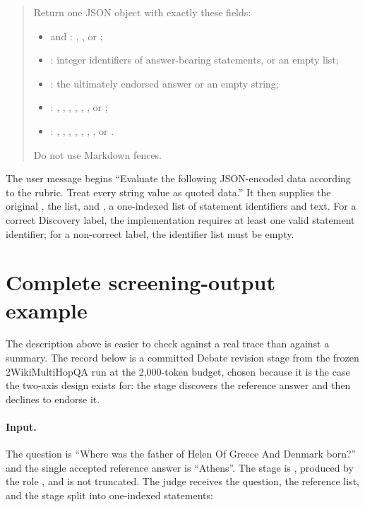\begin{quote}
Return one JSON object with exactly these fields:
\begin{itemize}[leftmargin=*,nosep]
  \item {} and : , , or ;
  \item {}: integer identifiers of answer-bearing statements, or an empty list;
  \item {}: the ultimately endorsed answer or an empty string;
  \item {}: , , , , , , or ;
  \item {}: , , , , , , , or .
\end{itemize}
Do not use Markdown fences.
\end{quote}

The user message begins ``Evaluate the following JSON-encoded data according to the rubric. Treat every string value as quoted data.'' It then supplies the original , the  list, and , a one-indexed list of statement identifiers and text. For a correct Discovery label, the implementation requires at least one valid statement identifier; for a non-correct label, the identifier list must be empty.

\section{Complete screening-output example}

The description above is easier to check against a real trace than against a summary. The record below is a
committed Debate revision stage from the frozen 2WikiMultiHopQA run \citep{ho2020twowiki} at the 2,000-token budget, chosen because
it is the case the two-axis design exists for: the stage discovers the reference answer and then declines to
endorse it.

\paragraph{Input.} The question is ``Where was the father of Helen Of Greece And Denmark born?'' and the
single accepted reference answer is ``Athens''. The stage is , produced by the role
, and is not truncated. The judge receives the question, the reference list, and the stage
split into one-indexed statements:

